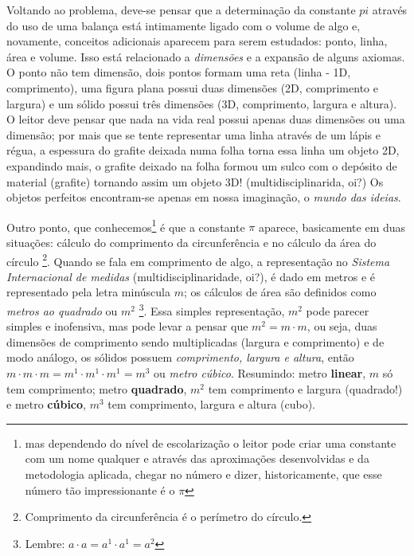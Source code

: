 Voltando ao problema, deve-se pensar que a determinação da constante $pi$ através do uso de uma balança está intimamente ligado com o volume de algo e, novamente, conceitos adicionais aparecem para serem estudados: ponto, linha, área e volume. Isso está relacionado a \textit{dimensões} e a expansão de alguns axiomas. O ponto não tem dimensão, dois pontos formam uma reta (linha - 1D, comprimento), uma figura plana possui duas dimensões (2D, comprimento e largura) e um sólido possui três dimensões (3D, comprimento, largura e altura). O leitor deve pensar que nada na vida real possui apenas duas dimensões ou uma dimensão; por mais que se tente representar uma linha através de um lápis e régua, a espessura do grafite deixada numa folha torna essa linha um objeto 2D, expandindo mais, o grafite deixado na folha formou um sulco com o depósito de material (grafite) tornando assim um objeto 3D! (multidisciplinarida, oi?) Os objetos perfeitos encontram-se apenas em nossa imaginação, o \textit{mundo das ideias}.

Outro ponto, que conhecemos\footnote{mas dependendo do nível de escolarização o leitor pode criar uma constante com um nome qualquer e através das aproximações desenvolvidas e da metodologia aplicada, chegar no número e dizer, historicamente, que esse número tão impressionante é o $\pi$} é que a constante $\pi$ aparece, basicamente em duas situações: cálculo do comprimento da circunferência e no cálculo da área do círculo \footnote{Comprimento da circunferência é o perímetro do círculo.}. Quando se fala em comprimento de algo, a representação no \textit{Sistema Internacional de medidas} (multidisciplinaridade, oi?), é dado em metros e é representado pela letra minúscula $m$; os cálculos de área são definidos como \textit{metros ao quadrado} ou $m^2$ \footnote{Lembre: $a \cdot a = a^1 \cdot a^1 = a^2$}. Essa simples representação, $m^2$ pode parecer simples e inofensiva, mas pode levar a pensar que $m^2 = m \cdot m$, ou seja, duas dimensões de comprimento sendo multiplicadas (largura e comprimento) e de modo análogo, os sólidos possuem \textit{comprimento, largura e altura}, então $m \cdot m \cdot m = m^1 \cdot m^1 \cdot m^1 = m^3$ ou \textit{metro cúbico}. Resumindo: metro \textbf{linear}, $m$ só tem comprimento; metro \textbf{quadrado}, $m^2$ tem comprimento e largura (quadrado!) e metro \textbf{cúbico}, $m^3$ tem comprimento, largura e altura (cubo).

